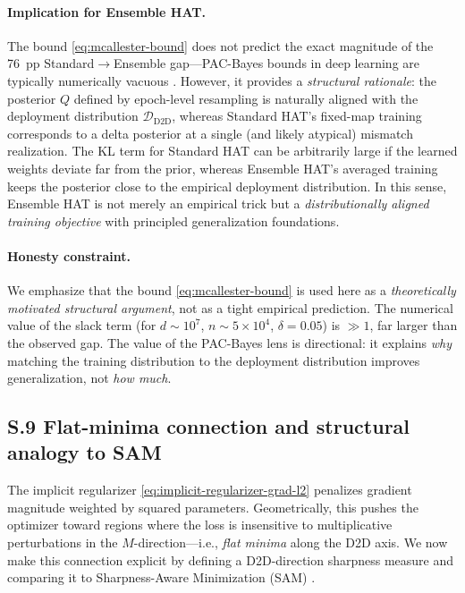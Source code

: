 \paragraph{Implication for Ensemble HAT.} The bound \eqref{eq:mcallester-bound} does not predict the exact magnitude of the 76~pp Standard$\to$Ensemble gap---PAC-Bayes bounds in deep learning are typically numerically vacuous \citep{perez2021tighter}. However, it provides a \emph{structural rationale}: the posterior $Q$ defined by epoch-level resampling is naturally aligned with the deployment distribution $\mathcal{D}_{\text{D2D}}$, whereas Standard HAT's fixed-map training corresponds to a delta posterior at a single (and likely atypical) mismatch realization. The KL term for Standard HAT can be arbitrarily large if the learned weights deviate far from the prior, whereas Ensemble HAT's averaged training keeps the posterior close to the empirical deployment distribution. In this sense, Ensemble HAT is not merely an empirical trick but a \emph{distributionally aligned training objective} with principled generalization foundations.

\paragraph{Honesty constraint.} We emphasize that the bound \eqref{eq:mcallester-bound} is used here as a \emph{theoretically motivated structural argument}, not as a tight empirical prediction. The numerical value of the slack term (for $d\sim 10^7$, $n\sim 5\times 10^4$, $\delta=0.05$) is $\gg 1$, far larger than the observed gap. The value of the PAC-Bayes lens is directional: it explains \emph{why} matching the training distribution to the deployment distribution improves generalization, not \emph{how much}.

\subsection*{S.9 Flat-minima connection and structural analogy to SAM}

The implicit regularizer \eqref{eq:implicit-regularizer-grad-l2} penalizes gradient magnitude weighted by squared parameters. Geometrically, this pushes the optimizer toward regions where the loss is insensitive to multiplicative perturbations in the $M$-direction---i.e., \emph{flat minima} along the D2D axis. We now make this connection explicit by defining a D2D-direction sharpness measure and comparing it to Sharpness-Aware Minimization (SAM) \citep{foret2021sharpness}.

